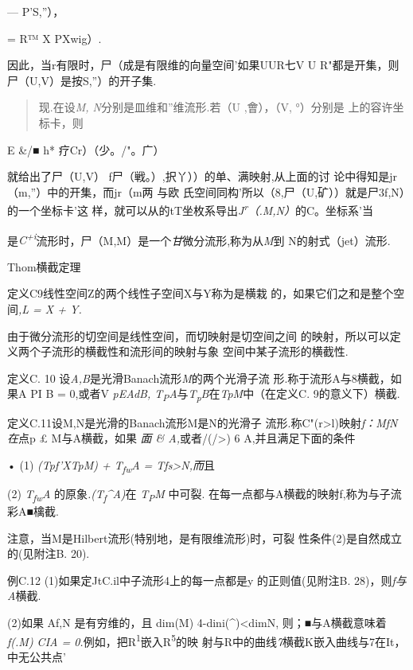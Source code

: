 \documentclass{article}
\begin{document}
--- P'S,''），

= R™ X PXwig）.

因此，当r有限时，尸（成是有限维的向量空间'如果UUR七V U
R"都是开集，则尸（U,V）是按S,''）的开子集.

\begin{quote}
现.在设\emph{M, N}分别是皿维和''维流形.若（U ,會），（V, °）分别是
上的容许坐标卡，则
\end{quote}

E \&/■ h* 疗Cr）（少。/"。广）

就给出了尸（U,V） f尸（戦。）,択丫））的单、满映射,从上面的讨
论中得知是jr（m,''）中的开集，而jr（m两 与欧
氏空间同构'所以（8,尸（U,矿））就是尸3f,N）的一个坐标卡'这
样，就可以从的tT坐枚系导出\emph{J\textsuperscript{r}（.M,N）}的C。坐标系'当

是\emph{C\textsuperscript{+i}}流形时，尸（M,M）是一个\emph{甘}微分流形,称为从\emph{M}到
N的射式（jet）流形.

Thom横截定理

定义C9线性空间Z的两个线性子空间X与Y称为是横栽
的，如果它们之和是整个空间\emph{,L = X + Y.}

由于微分流形的切空间是线性空间，而切映射是切空间之间
的映射，所以可以定义两个子流形的横截性和流形间的映射与象
空间中某子流形的横截性.

定义C. 10 设\emph{A,B}是光滑Banach流形\emph{M}的两个光滑子流
形.称于流形A与8横截，如果A PI B = 0,或者V \emph{pEAdB,
T\textsubscript{P}A}与\emph{T\textsubscript{p}B}在\emph{TpM}中（在定义C.
9的意义下）横截.

定义C.11设M,N是光滑的Banach流形M是N的光滑子
流形.称C"(r\textgreater{}l)映射\emph{f：MfN在}点p £ M与A横截，如果
\emph{面 \& A,}或者/(/\textgreater{}) 6 A,并且满足下面的条件

• (1) \emph{(Tpf'XTpM) + T\textsubscript{fw}A = Tfs\textgreater{}N,而}且

(2) \emph{T\textsubscript{fw}A}
的原象\emph{.(T\textsubscript{f}\^{}A)}在 \emph{T\textsubscript{P}M}
中可裂. 在每一点都与A横截的映射f,称为与子流彩A■檎截.

注意，当M是Hilbert流形(特别地，是有限维流形)时，可裂
性条件(2)是自然成立的(见附注B. 20).

例C.12 (1)如果定JtC.il中子流形4上的每一点都是y 的正则值(见附注B.
28)，则\emph{f与A}横截.

(2)如果 Af,N 是有穷维的，且 dim(M) 4-dini(\^{})\textless{}dimN,
则；■与A横截意味着\emph{f(.M) CIA =
0.}例如，把R\textsuperscript{1}嵌入R\textsuperscript{5}的映
射与R中的曲线\emph{7}横截K嵌入曲线与7在It，中无公共点'
\end{document}
